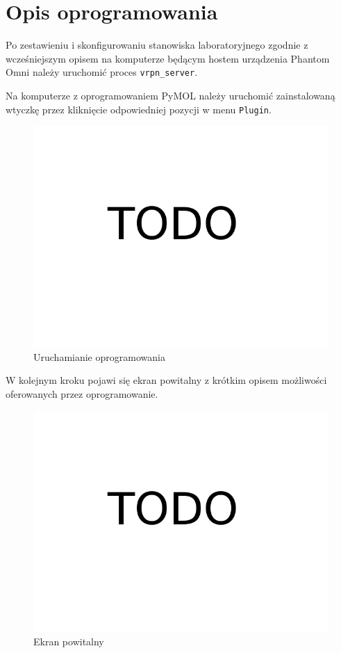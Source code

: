 \documentclass[licencjacka]{pracamgr}
\begin{document}
\section{Opis oprogramowania}
Po zestawieniu i skonfigurowaniu stanowiska laboratoryjnego zgodnie z wcześniejszym opisem na komputerze będącym hostem urządzenia Phantom Omni należy uruchomić proces \texttt{vrpn\_server}.

Na komputerze z oprogramowaniem PyMOL należy uruchomić zainstalowaną wtyczkę przez kliknięcie odpowiedniej pozycji w menu \texttt{Plugin}.

\begin{figure}[H]
\centering
\includegraphics[scale=0.3,center]{todo}
\caption{Uruchamianie oprogramowania}
\end{figure}

W kolejnym kroku pojawi się ekran powitalny z krótkim opisem możliwości oferowanych przez oprogramowanie.

\begin{figure}[H]
\centering
\includegraphics[scale=0.3,center]{todo}
\caption{Ekran powitalny}
\end{figure}
\end{document}
